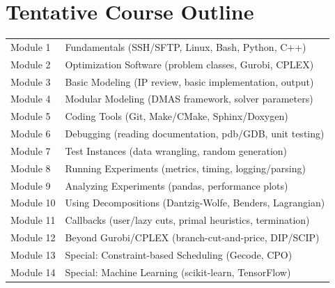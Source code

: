 \documentclass[12pt]{article}
\begin{document}
\section*{Tentative Course Outline}
\begin{table}[h!]
\begin{tabular}{|l|l|}
    \hline
    Module 1 & Fundamentals (SSH/SFTP, Linux, Bash, Python, C++) \\
    Module 2 & Optimization Software (problem classes, Gurobi, CPLEX) \\
    Module 3 & Basic Modeling (IP review, basic implementation, output) \\
    Module 4 & Modular Modeling (DMAS framework, solver parameters) \\
    Module 5 & Coding Tools (Git, Make/CMake, Sphinx/Doxygen) \\
    Module 6 & Debugging (reading documentation, pdb/GDB, unit testing) \\
    Module 7 & Test Instances (data wrangling, random generation) \\
    Module 8 & Running Experiments (metrics, timing, logging/parsing) \\
    Module 9 & Analyzing Experiments (pandas, performance plots) \\
    Module 10 & Using Decompositions (Dantzig-Wolfe, Benders, Lagrangian) \\
    Module 11 & Callbacks (user/lazy cuts, primal heuristics, termination) \\
    Module 12 & Beyond Gurobi/CPLEX (branch-cut-and-price, DIP/SCIP) \\
    Module 13 & Special: Constraint-based Scheduling (Gecode, CPO) \\
    Module 14 & Special: Machine Learning (scikit-learn, TensorFlow) \\
    \hline
\end{tabular}
\end{table}

\end{document}
